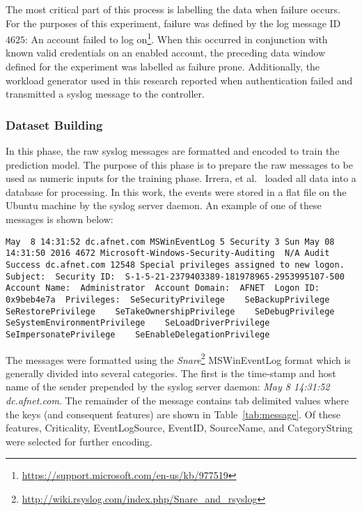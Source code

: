 The most critical part of this process is labelling the data when failure
occurs.  For the purposes of this experiment, failure was defined by the log
message ID $4625$: An account failed to log
on\footnote{\url{https://support.microsoft.com/en-us/kb/977519}}.  When this
occurred in conjunction with known valid credentials on an enabled account, the
preceding data window defined for the experiment was labelled as failure prone.
Additionally, the workload generator used in this research reported when
authentication failed and transmitted a syslog message to the controller.  

\subsubsection{Dataset Building} \label{sec:dataset.building}
In this phase, the raw syslog messages are formatted and encoded to train the
prediction model.  The purpose of this phase is to prepare the raw messages to
be used as numeric inputs for the training phase.  Irrera, et
al.~\cite{irrera2015} loaded all data into a database for processing.  In this
work, the events were stored in a flat file on the Ubuntu machine by
the syslog server daemon.  An example of one of these messages is shown below:

\begin{lstlisting}
May  8 14:31:52 dc.afnet.com MSWinEventLog 5 Security 3 Sun May 08 14:31:50 2016 4672 Microsoft-Windows-Security-Auditing  N/A Audit Success dc.afnet.com 12548 Special privileges assigned to new logon.  Subject:  Security ID:  S-1-5-21-2379403389-181978965-2953995107-500  Account Name:  Administrator  Account Domain:  AFNET  Logon ID:  0x9beb4e7a  Privileges:  SeSecurityPrivilege    SeBackupPrivilege    SeRestorePrivilege    SeTakeOwnershipPrivilege    SeDebugPrivilege    SeSystemEnvironmentPrivilege    SeLoadDriverPrivilege    SeImpersonatePrivilege    SeEnableDelegationPrivilege
\end{lstlisting}

The messages were formatted using the
\emph{Snare}\footnote{\url{http://wiki.rsyslog.com/index.php/Snare\_and\_rsyslog}}
MSWinEventLog format which is generally divided into several categories.  The
first is the time-stamp and host name of the sender prepended by the syslog
server daemon: \emph{May 8 14:31:52 dc.afnet.com}.  The remainder of the
message contains tab delimited values where the keys (and consequent features)
are shown in Table~\ref{tab:message}.  Of these features, Criticality,
EventLogSource, EventID, SourceName, and CategoryString were selected for
further encoding.

